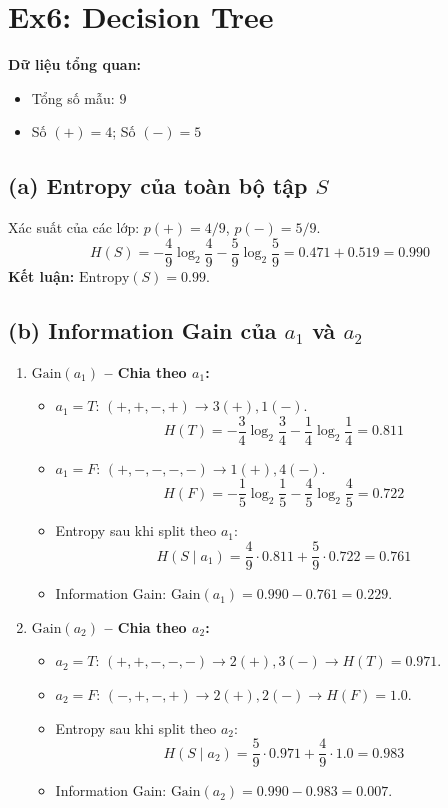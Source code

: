 \section{Ex6: Decision Tree}

\textbf{Dữ liệu tổng quan:}
\begin{itemize}
    \item Tổng số mẫu: $9$
    \item Số $(+) = 4$; Số $(-) = 5$
\end{itemize}

\subsection*{(a) Entropy của toàn bộ tập $S$}
Xác suất của các lớp: $p(+) = 4/9$, $p(-) = 5/9$.
$$H(S) = -\frac{4}{9}\log_2\frac{4}{9} - \frac{5}{9}\log_2\frac{5}{9} = 0.471 + 0.519 = 0.990$$
\textbf{Kết luận:} $\text{Entropy}(S) = 0.99$.

\subsection*{(b) Information Gain của $a_1$ và $a_2$}
\begin{enumerate}
    \item \textbf{$\text{Gain}(a_1)$ -- Chia theo $a_1$:}
    \begin{itemize}
        \item $a_1 = T$: $(+, +, -, +) \rightarrow 3(+), 1(-)$.
        $$H(T) = -\frac{3}{4}\log_2\frac{3}{4} - \frac{1}{4}\log_2\frac{1}{4} = 0.811$$
        \item $a_1 = F$: $(+, -, -, -, -) \rightarrow 1(+), 4(-)$.
        $$H(F) = -\frac{1}{5}\log_2\frac{1}{5} - \frac{4}{5}\log_2\frac{4}{5} = 0.722$$
        \item Entropy sau khi split theo $a_1$:
        $$H(S \mid a_1) = \frac{4}{9}\cdot 0.811 + \frac{5}{9}\cdot 0.722 = 0.761$$
        \item Information Gain: $\text{Gain}(a_1) = 0.990 - 0.761 = 0.229$.
    \end{itemize}

    \item \textbf{$\text{Gain}(a_2)$ -- Chia theo $a_2$:}
    \begin{itemize}
        \item $a_2 = T$: $(+, +, -, -, -) \rightarrow 2(+), 3(-) \rightarrow H(T) = 0.971$.
        \item $a_2 = F$: $(-, +, -, +) \rightarrow 2(+), 2(-) \rightarrow H(F) = 1.0$.
        \item Entropy sau khi split theo $a_2$:
        $$H(S \mid a_2) = \frac{5}{9}\cdot 0.971 + \frac{4}{9}\cdot 1.0 = 0.983$$
        \item Information Gain: $\text{Gain}(a_2) = 0.990 - 0.983 = 0.007$.
    \end{itemize}
\end{enumerate}

